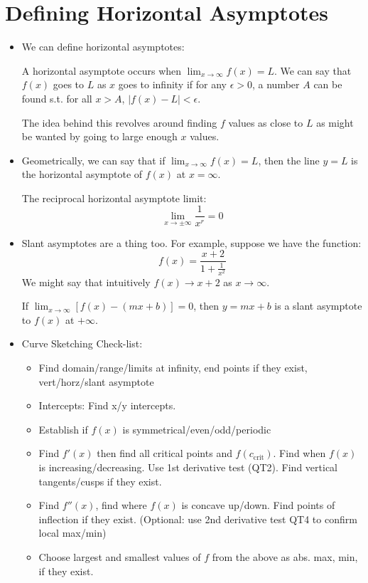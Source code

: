 \section{Defining Horizontal Asymptotes}
\begin{itemize}
    \item We can define horizontal asymptotes:
    \begin{definition}
        A horizontal asymptote occurs when $\lim_{x\to\infty}f(x)=L$. We can say that 
        $f(x)$ goes to $L$ as $x$ goes to infinity if for any $\epsilon>0$, a number $A$ can be found s.t. for all $x>A$, $|f(x)-L|<\epsilon$.
        \vspace{2mm}

        The idea behind this revolves around finding $f$ values as close to $L$ as might be wanted by going to large enough $x$ values.
    \end{definition}
    \item Geometrically, we can say that if $\displaystyle \lim_{x\to\infty}f(x) = L$, then the line $y=L$ is the horizontal asymptote of $f(x)$ at $x=\infty$.
    \begin{theorem}
        The reciprocal horizontal asymptote limit:
        \begin{equation}
            \lim_{x\to \pm \infty} \frac{1}{x^r} = 0
            \label{eq:}
        \end{equation}
    \end{theorem}
    \item Slant asymptotes are a thing too. For example, suppose we have the function:
    \begin{equation}
        f(x)=\frac{x+2}{1+\frac{1}{x^2}}
        \label{eq:}
    \end{equation}
    We might say that intuitively $f(x)\to x+2$ as $x\to \infty$.
    \begin{definition}
        If $\lim_{x\to \infty} \left[f(x)-(mx+b)\right]=0$, then $y=mx+b$ is a slant asymptote to $f(x)$ at $+\infty$.
    \end{definition}
    \item Curve Sketching Check-list:
    \begin{itemize}
        \item Find domain/range/limits at infinity, end points if they exist, vert/horz/slant asymptote
        \item Intercepts: Find x/y intercepts.
        \item Establish if $f(x)$ is symmetrical/even/odd/periodic
        \item Find $f'(x)$ then find all critical points and $f(c_\text{crit})$. Find when $f(x)$ is increasing/decreasing. Use 1st derivative test (QT2). Find vertical tangents/cusps if they exist.
        \item Find $f''(x)$, find where $f(x)$ is concave up/down. Find points of inflection if they exist. (Optional: use 2nd derivative test QT4 to confirm local max/min)
        \item Choose largest and smallest values of $f$ from the above as abs. max, min, if they exist.
    \end{itemize}
\end{itemize}